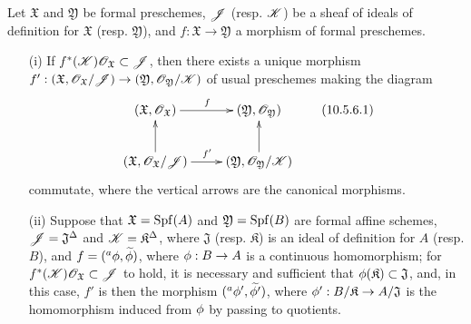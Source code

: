 \begin{proposition}[10.5.6]
\label{I.10.5.6}
Let $\mathfrak{X}$ and $\mathfrak{Y}$ be formal preschemes, $\mathscr{J}$ (resp. $\mathscr{K}$) be a sheaf of ideals of definition for $\mathfrak{X}$ (resp. $\mathfrak{Y}$), and $f:\mathfrak{X}\to\mathfrak{Y}$ a morphism of formal preschemes.
\begin{enumerate}
  \item[\rm{(i)}] If $f^*(\mathscr{K})\mathscr{O}_\mathfrak{X}\subset\mathscr{J}$, then there exists a unique morphism $f':(\mathfrak{X},\sh{O}_\mathfrak{X}/\sh{J})\to(\mathfrak{Y},\sh{O}_\mathfrak{Y}/\sh{K})$ of usual preschemes making the diagram
    \[
    \label{I.10.5.6.1}
      \xymatrix{
        (\mathfrak{X},\sh{O}_\mathfrak{X})\ar[r]^f &
        (\mathfrak{Y},\sh{O}_\mathfrak{Y})\\
        (\mathfrak{X},\sh{O}_\mathfrak{X}/\sh{J})\ar[r]^{f'}\ar[u] &
        (\mathfrak{Y},\sh{O}_\mathfrak{Y}/\sh{K})\ar[u]
      }
      \tag{10.5.6.1}
    \]
    commutate, where the vertical arrows are the canonical morphisms.
  \item[\rm{(ii)}] Suppose that $\mathfrak{X}=\operatorname{Spf}(A)$ and $\mathfrak{Y}=\operatorname{Spf}(B)$ are formal affine schemes, $\mathscr{J}=\mathfrak{J}^\Delta$ and $\mathscr{K}=\mathfrak{K}^\Delta$, where $\mathfrak{J}$ (resp. $\mathfrak{K}$) is an ideal of definition for $A$ (resp. $B$), and $f=({}^a\phi,\widetilde{\phi})$, where $\vphi:B\to A$ is a continuous homomorphism;
    for $f^*(\mathscr{K})\mathscr{O}_\mathfrak{X}\subset\mathscr{J}$ to hold, it is necessary and sufficient that $\phi(\mathfrak{K})\subset\mathfrak{J}$, and, in this case, $f'$ is then the morphism $({}^a\phi',\widetilde{\phi'})$, where $\vphi':B/\mathfrak{K}\to A/\mathfrak{J}$ is the homomorphism induced from $\phi$ by passing to quotients.
\end{enumerate}
\end{proposition}

